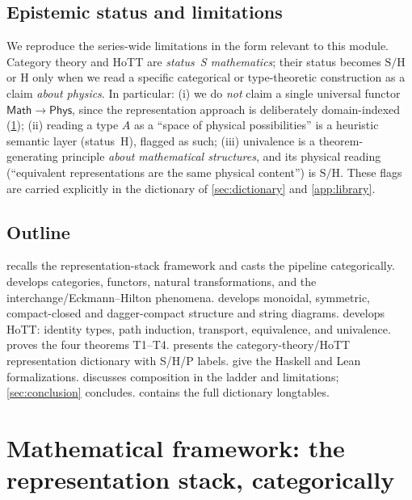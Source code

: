\documentclass[12pt]{article}
\theoremstyle{definition}
\theoremstyle{remark}
\newcommand{\Phys}{\mathsf{Phys}}
\newcommand{\Math}{\mathsf{Math}}
\begin{document}
\subsection{Epistemic status and limitations}

We reproduce the series-wide limitations in the form relevant to this module.
Category theory and HoTT are \emph{status~S mathematics}; their status becomes
$\mathrm{S/H}$ or $\mathrm{H}$ only when we read a specific categorical or
type-theoretic construction as a claim \emph{about physics}. In particular: (i)
we do \emph{not} claim a single universal functor $\Math\to\Phys$, since the
representation approach is deliberately domain-indexed
(\cref{sec:framework}); (ii) reading a type $A$ as a ``space of physical
possibilities'' is a heuristic semantic layer (status~$\mathrm{H}$), flagged as
such; (iii) univalence is a theorem-generating principle \emph{about
mathematical structures}, and its physical reading (``equivalent representations
are the same physical content'') is $\mathrm{S/H}$. These flags are carried
explicitly in the dictionary of \cref{sec:dictionary} and \cref{app:library}.

\subsection{Outline}

 recalls the representation-stack framework and casts the
pipeline categorically.  develops categories, functors, natural
transformations, and the interchange/Eckmann--Hilton phenomena.
 develops monoidal, symmetric, compact-closed and
dagger-compact structure and string diagrams.  develops HoTT:
identity types, path induction, transport, equivalence, and univalence.
 proves the four theorems T1--T4. 
presents the category-theory/HoTT representation dictionary with S/H/P labels.
 give the Haskell and Lean formalizations.
 discusses composition in the ladder and limitations;
\cref{sec:conclusion} concludes.  contains the full
dictionary longtables.

\section{Mathematical framework: the representation stack, categorically}
\label{sec:framework}
\end{document}
